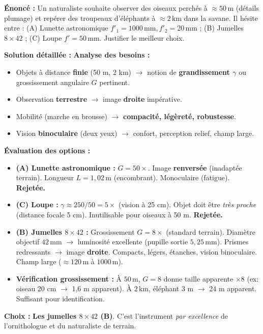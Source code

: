\documentclass[11pt]{article}
\begin{document}
\begin{exoresolu}
\textbf{Énoncé :} Un naturaliste souhaite observer des oiseaux perchés à $\approx 50\,\text{m}$ (détails plumage) et repérer des troupeaux d'éléphants à $\approx 2\,\text{km}$ dans la savane. Il hésite entre : (A) Lunette astronomique $f'_1=1000\,\text{mm}, f'_2=20\,\text{mm}$ ; (B) Jumelles $8\times42$ ; (C) Loupe $f'=50\,\text{mm}$. Justifier le meilleur choix.

\textbf{Solution détaillée :}
\tcblower
\textbf{Analyse des besoins :}
\begin{itemize}
    \item Objets à distance \textbf{finie} (50 m, 2 km) $\to$ notion de \textbf{grandissement $\gamma$} ou grossissement angulaire $G$ pertinent.
    \item Observation \textbf{terrestre} $\to$ image \textbf{droite} impérative.
    \item Mobilité (marche en brousse) $\to$ \textbf{compacité, légèreté, robustesse}.
    \item Vision \textbf{binoculaire} (deux yeux) $\to$ confort, perception relief, champ large.
\end{itemize}

\textbf{Évaluation des options :}
\begin{itemize}
    \item \textbf{(A) Lunette astronomique :} $G = 50\times$. Image \textbf{renversée} (inadaptée terrain). Longueur $L=1,02\,\text{m}$ (encombrant). Monoculaire (fatigue). \textbf{Rejetée.}
    \item \textbf{(C) Loupe :} $\gamma \approx 250/50 = 5\times$ (vision à 25 cm). Objet doit être \emph{très proche} (distance focale 5 cm). Inutilisable pour oiseaux à 50 m. \textbf{Rejetée.}
    \item \textbf{(B) Jumelles $8\times42$ :} Grossissement $G=8\times$ (standard terrain). Diamètre objectif $42\,\text{mm}$ $\to$ luminosité excellente (pupille sortie $5,25\,\text{mm}$). Prismes redressants $\to$ image \textbf{droite}. Compacts, légers, étanches, vision binoculaire. Champ large ($\approx 120\,\text{m}$ à $1000\,\text{m}$).
    \item \textbf{Vérification grossissement :} À $50\,\text{m}$, $G=8$ donne taille apparente $\times 8$ (ex: oiseau 20 cm $\to$ 1,6 m apparent). À $2\,\text{km}$, éléphant 3 m $\to$ 24 m apparent. Suffisant pour identification.
\end{itemize}
\textbf{Choix :} \textbf{Les jumelles $8\times42$ (B)}. C'est l'instrument \emph{par excellence} de l'ornithologue et du naturaliste de terrain.
\end{exoresolu}
\end{document}
